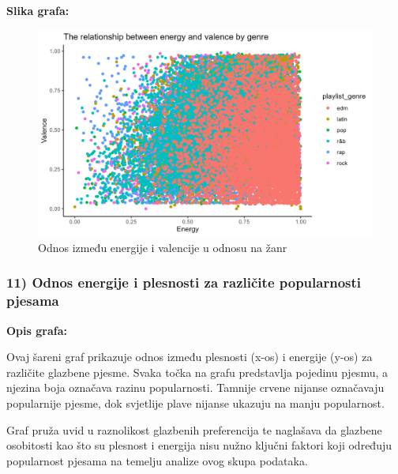     \textbf{Slika grafa:}
    \begin{figure}[H]
        \includegraphics[scale=0.9]{slike/The relationship between energy and valence by genre.png}
        \centering
        \caption{Odnos između energije i valencije u odnosu na žanr}
        
    \end{figure}

	
		\subsubsection{11) Odnos energije i plesnosti za različite popularnosti pjesama}
	
	\textbf{Opis grafa:}
	
	Ovaj šareni graf prikazuje odnos između plesnosti (x-os) i energije (y-os) za različite glazbene pjesme. Svaka točka na grafu predstavlja pojedinu pjesmu, a njezina boja označava razinu popularnosti. Tamnije crvene nijanse označavaju popularnije pjesme, dok svjetlije plave nijanse ukazuju na manju popularnost.
	
	Graf pruža uvid u raznolikost glazbenih preferencija te naglašava da glazbene osobitosti kao što su plesnost i energija nisu nužno ključni faktori koji određuju popularnost pjesama na temelju analize ovog skupa podataka.
	
